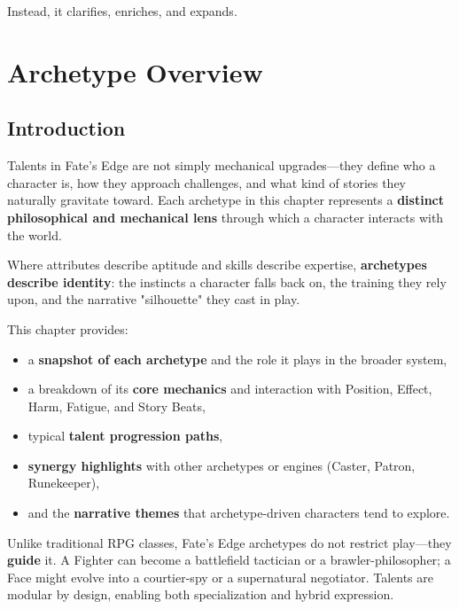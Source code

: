\documentclass[11pt]{book}
\begin{document}
Instead, it clarifies, enriches, and expands.

\newpage

\chapter{Archetype Overview}

\section*{Introduction}

Talents in Fate's Edge are not simply mechanical upgrades---they define who a character is,
how they approach challenges, and what kind of stories they naturally gravitate toward.
Each archetype in this chapter represents a \textbf{distinct philosophical and mechanical lens}
through which a character interacts with the world.

Where attributes describe aptitude and skills describe expertise, \textbf{archetypes describe
identity}: the instincts a character falls back on, the training they rely upon, and the
narrative "silhouette" they cast in play.

This chapter provides:
\begin{itemize}
    \item a \textbf{snapshot of each archetype} and the role it plays in the broader system,
    \item a breakdown of its \textbf{core mechanics} and interaction with Position, Effect, Harm,
          Fatigue, and Story Beats,
    \item typical \textbf{talent progression paths},
    \item \textbf{synergy highlights} with other archetypes or engines (Caster, Patron, Runekeeper),
    \item and the \textbf{narrative themes} that archetype-driven characters tend to explore.
\end{itemize}

Unlike traditional RPG classes, Fate's Edge archetypes do not restrict play---they \textbf{guide}
it. A Fighter can become a battlefield tactician or a brawler-philosopher; a Face might evolve
into a courtier-spy or a supernatural negotiator. Talents are modular by design, enabling both
specialization and hybrid expression.
\end{document}
